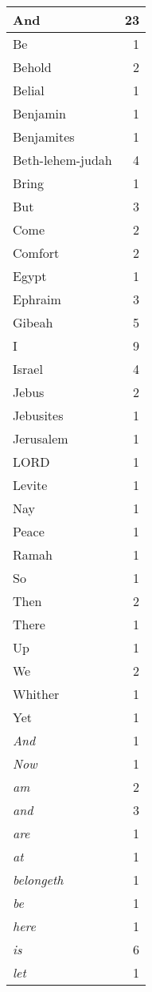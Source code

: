 \begin{center}
\begin{longtable}{l|r}
\hline \hline
\endlastfoot
And & 23 \\ \hline
Be & 1 \\ \hline
Behold & 2 \\ \hline
Belial & 1 \\ \hline
Benjamin & 1 \\ \hline
Benjamites & 1 \\ \hline
Beth-lehem-judah & 4 \\ \hline
Bring & 1 \\ \hline
But & 3 \\ \hline
Come & 2 \\ \hline
Comfort & 2 \\ \hline
Egypt & 1 \\ \hline
Ephraim & 3 \\ \hline
Gibeah & 5 \\ \hline
I & 9 \\ \hline
Israel & 4 \\ \hline
Jebus & 2 \\ \hline
Jebusites & 1 \\ \hline
Jerusalem & 1 \\ \hline
LORD & 1 \\ \hline
Levite & 1 \\ \hline
Nay & 1 \\ \hline
Peace & 1 \\ \hline
Ramah & 1 \\ \hline
So & 1 \\ \hline
Then & 2 \\ \hline
There & 1 \\ \hline
Up & 1 \\ \hline
We & 2 \\ \hline
Whither & 1 \\ \hline
Yet & 1 \\ \hline
\emph{And} & 1 \\ \hline
\emph{Now} & 1 \\ \hline
\emph{am} & 2 \\ \hline
\emph{and} & 3 \\ \hline
\emph{are} & 1 \\ \hline
\emph{at} & 1 \\ \hline
\emph{belongeth} & 1 \\ \hline
\emph{be} & 1 \\ \hline
\emph{here} & 1 \\ \hline
\emph{is} & 6 \\ \hline
\emph{let} & 1 \\ \hline

\end{longtable}
\end{center}
